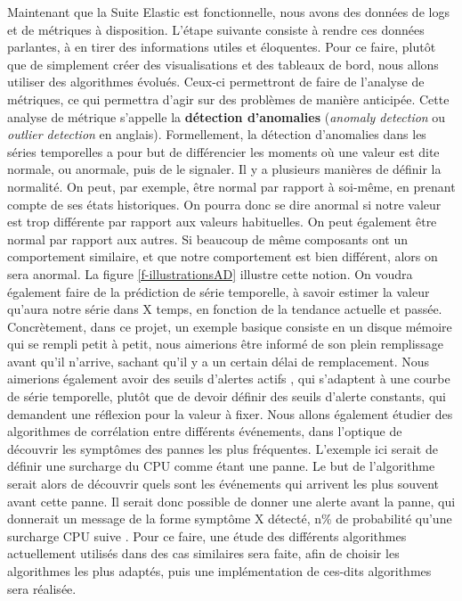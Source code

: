 \documentclass[paper=a4, fontsize=11pt]{scrartcl}
\begin{document}
Maintenant que la Suite Elastic est fonctionnelle, nous avons des données de logs et de métriques à disposition. L'étape suivante consiste à rendre ces données parlantes, à en tirer des informations utiles et éloquentes. Pour ce faire, plutôt que de simplement créer des visualisations et des tableaux de bord, nous allons utiliser des algorithmes évolués.\newline
Ceux-ci permettront de faire de l'analyse de métriques, ce qui permettra d'agir sur des problèmes de manière anticipée. Cette analyse de métrique s'appelle la \textbf{détection d'anomalies} (\textit{anomaly detection} ou \textit{outlier detection} en anglais). Formellement, la détection d'anomalies dans les séries temporelles a pour but de différencier les moments où une valeur est dite normale, ou anormale, puis de le signaler. Il y a plusieurs manières de définir la normalité. On peut, par exemple, 
être normal par rapport à soi-même, en prenant compte de ses états historiques. On pourra donc se dire anormal si notre valeur est trop différente par rapport aux valeurs habituelles. On peut également être normal par rapport aux autres. Si beaucoup de même composants ont un comportement similaire, et que notre comportement est bien différent, alors on sera anormal. La figure \ref{f-illustrationsAD} illustre cette notion. \newline
On voudra également faire de la prédiction de série temporelle, à savoir estimer la valeur qu'aura notre série dans X temps, en fonction de la tendance actuelle et passée.
Concrètement, dans ce projet, un exemple basique consiste en un disque mémoire qui se rempli petit à petit, nous aimerions être informé de son plein remplissage avant qu'il n'arrive, sachant qu'il y a un certain délai de remplacement. Nous aimerions également avoir des seuils d'alertes \og actifs \fg, qui s'adaptent à une courbe de série temporelle, plutôt que de devoir définir des seuils d'alerte constants, qui demandent une réflexion pour la valeur à fixer.\newline
Nous allons également étudier des algorithmes de corrélation entre différents événements, dans l'optique de découvrir les \og symptômes \fg des pannes les plus fréquentes. L'exemple ici serait de définir une surcharge du CPU comme étant une panne. Le but de l'algorithme serait alors de découvrir quels sont les événements qui arrivent les plus souvent avant cette panne. Il serait donc possible de donner une alerte avant la panne, qui donnerait un message de la forme \og symptôme X détecté, n\% de probabilité qu'une surcharge CPU suive \fg.\newline
Pour ce faire, une étude des différents algorithmes actuellement utilisés dans des cas similaires sera faite, afin de choisir les algorithmes les plus adaptés, puis une implémentation de ces-dits algorithmes sera réalisée.
\end{document}
